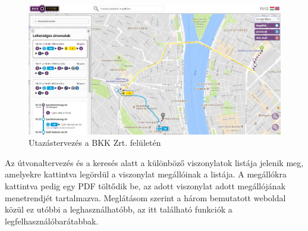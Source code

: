 \begin{figure}[h!]
\centering
\includegraphics[scale=0.4]{kepek/bkk_terkep.jpg}
\caption{Utazástervezés a BKK Zrt. felületén}
\label{fig:bkk_terkep}
\end{figure}

Az útvonaltervezés és a keresés alatt a különböző viszonylatok listája jelenik meg, amelyekre kattintva legördül a viszonylat megállóinak a listája. A megállókra kattintva pedig egy PDF töltődik be, az adott viszonylat adott megállójának menetrendjét tartalmazva.
Meglátásom szerint a három bemutatott weboldal közül ez utóbbi a leghasználhatóbb, az itt található funkciók a legfelhasználóbarátabbak.
